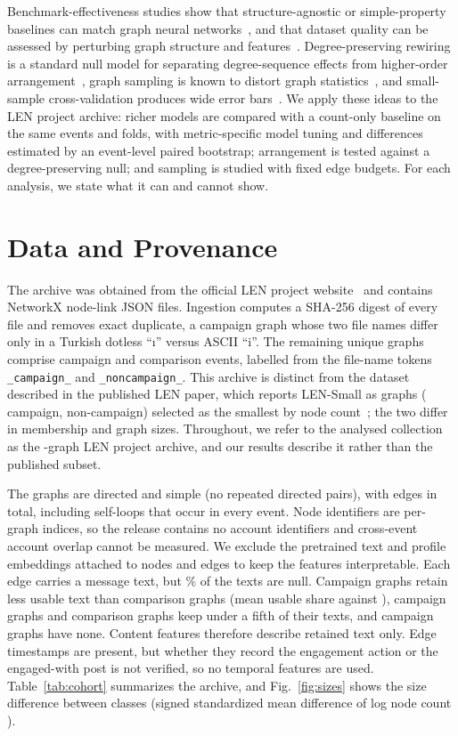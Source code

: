 \documentclass[conference]{IEEEtran}
\begin{document}
Benchmark-effectiveness studies show that structure-ag\-nos\-tic or simple-property baselines can match graph neural networks~\cite{li,errica}, and that dataset quality can be assessed by perturbing graph structure and features~\cite{coupette}. Degree-preserving rewiring is a standard null model for separating degree-sequence effects from higher-order arrangement~\cite{maslov}, graph sampling is known to distort graph statistics~\cite{leskovec}, and small-sample cross-validation produces wide error bars~\cite{varoquaux}. We apply these ideas to the LEN project archive: richer models are compared with a count-only baseline on the same events and folds, with metric-specific model tuning and differences estimated by an event-level paired bootstrap; arrangement is tested against a degree-preserving null; and sampling is studied with fixed edge budgets. For each analysis, we state what it can and cannot show.

\section{Data and Provenance}\label{sec:data}
The archive was obtained from the official LEN project website~\cite{repo} and contains \RArchiveFiles{} NetworkX node-link JSON files. Ingestion computes a SHA-256 digest of every file and removes \RDupRemoved{} exact duplicate, a campaign graph whose two file names differ only in a Turkish dotless ``\i'' versus ASCII ``i''. The remaining \RNEvents{} unique graphs comprise \RNCampaign{} campaign and \RNComparison{} comparison events, labelled from the file-name tokens \texttt{\_campaign\_} and \texttt{\_noncampaign\_}. This archive is distinct from the dataset described in the published LEN paper, which reports LEN-Small as \ROfficialN{} graphs (\ROfficialCamp{} campaign, \ROfficialNon{} non-campaign) selected as the smallest by node count~\cite{len}; the two differ in membership and graph sizes. Throughout, we refer to the analysed collection as the \RNEvents-graph LEN project archive, and our results describe it rather than the published subset.

The graphs are directed and simple (no repeated directed pairs), with \REdgesTotal{} edges in total, including \RSelfLoops{} self-loops that occur in every event. Node identifiers are per-graph indices, so the release contains no account identifiers and cross-event account overlap cannot be measured. We exclude the pretrained text and profile embeddings attached to nodes and edges to keep the features interpretable. Each edge carries a message text, but \RTextNullPct\% of the \RTextLinks{} texts are null. Campaign graphs retain less usable text than comparison graphs (mean usable share \RUsableCamp{} against \RUsableComp), \RLowTextCamp{} campaign graphs and \RLowTextComp{} comparison graphs keep under a fifth of their texts, and \RNoTextEvents{} campaign graphs have none. Content features therefore describe retained text only. Edge timestamps are present, but whether they record the engagement action or the engaged-with post is not verified, so no temporal features are used. Table~\ref{tab:cohort} summarizes the archive, and Fig.~\ref{fig:sizes} shows the size difference between classes (signed standardized mean difference of log node count \RSMDNodes).
\end{document}

